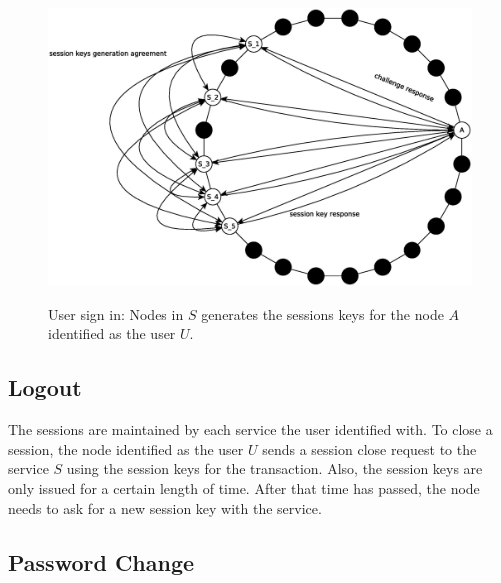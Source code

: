 \begin{figure}[!htb]
\centering
\includegraphics[width=14cm]{../img/sign_in_3}\\
\caption{User sign in: Nodes in $S$ generates the sessions keys for the node
$A$ identified as the user $U$.}
\label{fig:sign_in_3}
\end{figure}

\subsection{Logout}
The sessions are maintained by each service the user identified with. To close a
session, the node identified as the user $U$ sends a session close request to
the service $S$ using the session keys for the transaction. Also, the session
keys are only issued for a certain length of time. After that time has passed, the node needs
to ask for a new session key with the service.


\subsection{Password Change}

